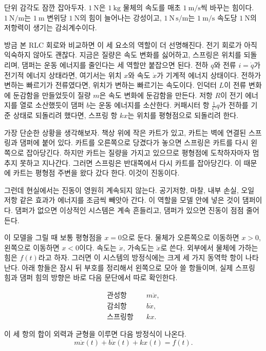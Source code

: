 단위 감각도 잠깐 잡아두자.
$1~\mathrm{N}$은 $1~\mathrm{kg}$ 물체의 속도를 매초 $1~\mathrm{m/s}$씩 바꾸는 힘이다.
$1~\mathrm{N/m}$는 $1~\mathrm{m}$ 변위당 $1~\mathrm{N}$의 힘이 늘어나는 강성이고, $1~\mathrm{N\,s/m}$는 $1~\mathrm{m/s}$ 속도당 $1~\mathrm{N}$의 저항력이 생기는 감쇠계수이다.

방금 본 RLC 회로와 비교하면 이 세 요소의 역할이 더 선명해진다.
전기 회로가 아직 익숙하지 않아도 괜찮다.
지금은 질량은 속도 변화를 싫어하고, 스프링은 위치를 되돌리며, 댐퍼는 운동 에너지를 줄인다는 세 역할만 붙잡으면 된다.
전하 $q$와 전류 $i=\dot{q}$가 전기적 에너지 상태라면, 여기서는 위치 $x$와 속도 $\dot{x}$가 기계적 에너지 상태이다.
전하가 변하는 빠르기가 전류였다면, 위치가 변하는 빠르기는 속도이다.
인덕터 $L$이 전류 변화에 둔감함을 만들었듯이 질량 $m$은 속도 변화에 둔감함을 만든다.
저항 $R$이 전기 에너지를 열로 소산했듯이 댐퍼 $b$는 운동 에너지를 소산한다.
커패시터 항 $\frac{1}{C}q$가 전하를 기준 상태로 되돌리려 했다면, 스프링 항 $kx$는 위치를 평형점으로 되돌리려 한다.

가장 단순한 상황을 생각해보자.
책상 위에 작은 카트가 있고, 카트는 벽에 연결된 스프링과 댐퍼에 붙어 있다.
카트를 오른쪽으로 당겼다가 놓으면 스프링은 카트를 다시 왼쪽으로 잡아당긴다.
하지만 카트는 질량을 가지고 있으므로 평형점에 도착하자마자 멈추지 못하고 지나간다.
그러면 스프링은 반대쪽에서 다시 카트를 잡아당긴다.
이 때문에 카트는 평형점 주변을 왔다 갔다 한다.
이것이 진동이다.

그런데 현실에서는 진동이 영원히 계속되지 않는다.
공기저항, 마찰, 내부 손실, 오일 저항 같은 효과가 에너지를 조금씩 빼앗아 간다.
이 역할을 모델 안에 넣은 것이 댐퍼이다.
댐퍼가 없으면 이상적인 시스템은 계속 흔들리고, 댐퍼가 있으면 진동이 점점 줄어든다.

이 모델을 그릴 때 보통 평형점을 $x=0$으로 둔다.
물체가 오른쪽으로 이동하면 $x>0$, 왼쪽으로 이동하면 $x<0$이다.
속도는 $\dot{x}$, 가속도는 $\ddot{x}$로 쓴다.
외부에서 물체에 가하는 힘은 $f(t)$라고 하자.
그러면 이 시스템의 방정식에는 크게 세 가지 동역학 항이 나타난다.
아래 항들은 잠시 뒤 부호를 정리해서 왼쪽으로 모아 쓸 항들이며, 실제 스프링 힘과 댐퍼 힘의 방향은 바로 다음 문단에서 따로 확인한다.

\begin{align}
  \text{관성항} &\quad m\ddot{x}, \\
  \text{감쇠항} &\quad b\dot{x}, \\
  \text{스프링항} &\quad kx.
\end{align}

이 세 항의 합이 외력과 균형을 이루면 다음 방정식이 나온다.
\begin{equation}
  m\ddot{x}(t)+b\dot{x}(t)+kx(t)=f(t).
  \label{eq:msd_force_balance_intro}
\end{equation}

